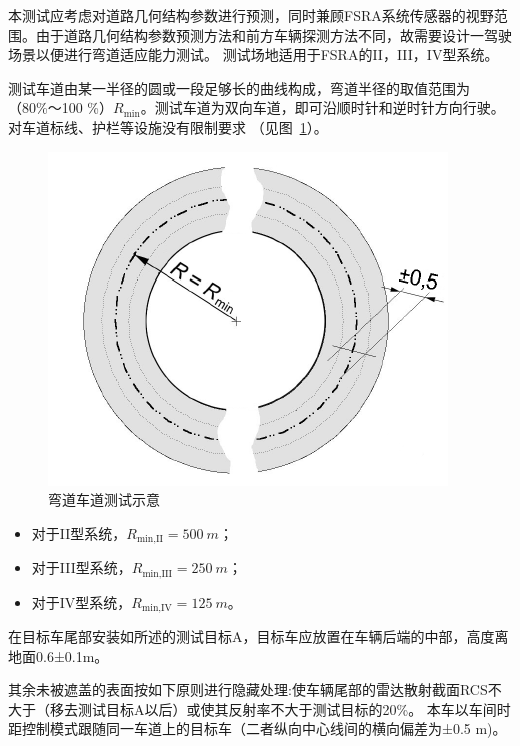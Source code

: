 \documentclass[is,copyright,is]{isov2}
\begin{document}
本测试应考虑对道路几何结构参数进行预测，同时兼顾FSRA系统传感器的视野范围。由于道路几何结构参数预测方法和前方车辆探测方法不同，故需要设计一驾驶场景以便进行弯道适应能力测试。
\label{7.6.1}
测试场地适用于FSRA的II，III，IV型系统。

测试车道由某一半径的圆或一段足够长的曲线构成，弯道半径的取值范围为（80\%〜100 \%）$R_\text{min}$。测试车道为双向车道，即可沿顺时针和逆时针方向行驶。对车道标线、护栏等设施没有限制要求 （见图~\ref{fig:outlinetrack}）。
\begin{figure}[htbp]
	\centering
	\includegraphics[width=0.4\linewidth]{figures/outlinetrack}
	\caption{弯道车道测试示意}
	\label{fig:outlinetrack}
\end{figure}

\begin{itemize}
	\item 对于II型系统，$R_\text{min,II} = \SI{500}{m}$；
	\item 对于III型系统，$R_\text{min,III} = \SI{250}{m}$；
		\item 对于IV型系统，$R_\text{min,IV} = \SI{125}{m}$。
\end{itemize}
在目标车尾部安装如所述的测试目标A，目标车应放置在车辆后端的中部，高度离地面0.6±0.1m。

其余未被遮盖的表面按如下原则进行隐藏处理:使车辆尾部的雷达散射截面RCS不大于（移去测试目标A以后）或使其反射率不大于测试目标的20\%。
本车以车间时距控制模式跟随同一车道上的目标车（二者纵向中心线间的横向偏差为±0.5 m)。
\end{document}
